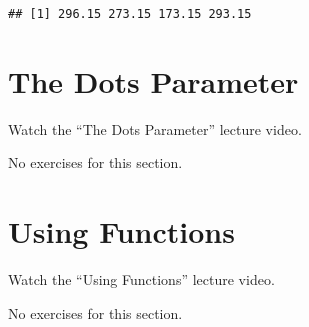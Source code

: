 \documentclass[
]{article}
\begin{document}
\begin{verbatim}
## [1] 296.15 273.15 173.15 293.15
\end{verbatim}

\hypertarget{the-dots-parameter}{%
\section{The Dots Parameter}\label{the-dots-parameter}}

Watch the ``The Dots Parameter'' lecture video.

No exercises for this section.

\hypertarget{using-functions}{%
\section{Using Functions}\label{using-functions}}

Watch the ``Using Functions'' lecture video.

No exercises for this section.
\end{document}
